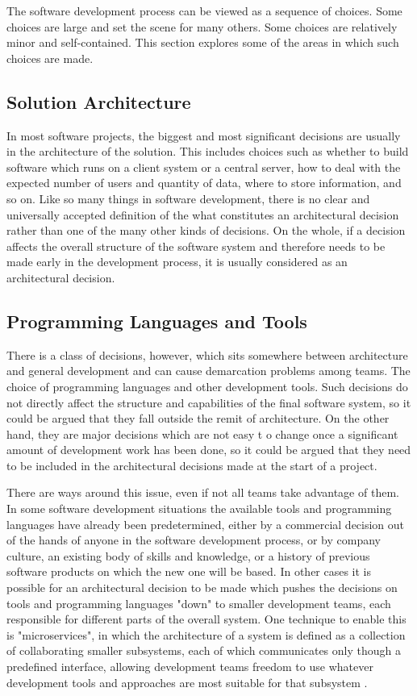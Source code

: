 The software development process can be viewed as a sequence of choices. Some choices are large and set the scene for many others. Some choices are relatively minor and self-contained. This section explores some of the areas in which such choices are made.

\subsection{Solution Architecture}

In most software projects, the biggest and most significant decisions are usually in the architecture of the solution. This includes choices such as whether to build software which runs on a client system or a central server, how to deal with the expected number of users and quantity of data, where to store information, and so on. Like so many things in software development, there is no clear and universally accepted definition of the what constitutes an architectural decision rather than one of the many other kinds of decisions. On the whole, if a decision affects the overall structure of the software system and therefore needs to be made early in the development process, it is usually considered as an architectural decision.

\subsection{Programming Languages and Tools}

There is a class of decisions, however, which sits somewhere between architecture and general development and can cause demarcation problems among teams. The choice of programming languages and other development tools. Such decisions do not directly affect the structure and capabilities of the final software system, so it could be argued that they fall outside the remit of architecture. On the other hand, they are major decisions which are not easy t o change once a significant amount of development work has been done, so it could be argued that they need to be included in the architectural decisions made at the start of a project. 

There are ways around this issue, even if not all teams take advantage of them. In some software development situations the available tools and programming languages have already been predetermined, either by a commercial decision out of the hands of anyone in the software development process, or by company culture, an existing body of skills and knowledge, or a history of previous software products on which the new one will be based. In other cases it is possible for an architectural decision to be made which pushes the decisions on tools and programming languages "down" to smaller development teams, each responsible for different parts of the overall system. One technique to enable this is "microservices", in which the architecture of a system is defined as a collection of collaborating smaller subsystems, each of which communicates only though a predefined interface, allowing development teams freedom to use whatever development tools and approaches are most suitable for that subsystem .

